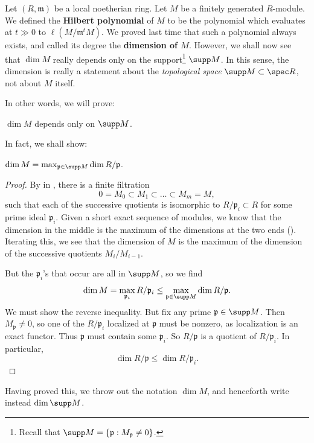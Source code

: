 Let $(R, \mathfrak{m})$ be a local noetherian ring. Let $M$ be a finitely generated
$R$-module. 	We defined the \textbf{Hilbert polynomial} of $M$ to be the
polynomial which evaluates at $t \gg 0$ to $\ell(M/\mathfrak{m}^tM)$. We proved
last time that such a polynomial always exists, and called its degree the
\textbf{dimension of $M$}. However, 
we shall now see that $\dim M$ really depends only on the support\footnote{
Recall that $\supp M = \left\{\mathfrak{p}: M_{\mathfrak{p}}\neq 0\right\}$.} $\supp M$.
In this sense, the dimension is really a statement about the \emph{topological
space} $\supp M \subset \spec R$, not about $M$ itself. 


In other words, we will prove:
\begin{proposition} 
$\dim M$ depends only on $\supp M$.
\end{proposition} 

In fact, we shall show:

\begin{proposition} 
$\dim M = \max_{\mathfrak{p} \in \supp M} \dim R/\mathfrak{p}$.
\end{proposition} 
\begin{proof} 
By  in , there is a finite filtration 
\[ 0 = M_0 \subset M_1 \subset \dots \subset M_m = M,  \]
such that each of the successive quotients is isomorphic to $R/\mathfrak{p}_i
\subset R$
for some prime ideal $\mathfrak{p}_i$. Given a short exact sequence
of modules, we know that the dimension in the middle is the maximum of the dimensions at the
two ends (). Iterating this, we see that the
dimension of $M$ is the maximum of the
dimension of the successive quotients $M_i/M_{i-1}$.

But the $\mathfrak{p}_i$'s that occur
are all in $\supp M$, so we find 
\[ \dim M = \max_{\mathfrak{p}_i} R/\mathfrak{p}_i \leq \max_{\mathfrak{p} \in \supp M} \dim R/\mathfrak{p}.  \]
We must show the reverse inequality. But fix any prime $\mathfrak{p} \in \supp
M$. Then $M_{\mathfrak{p}} \neq 0$, so one of the $R/\mathfrak{p}_i$ localized
at  $\mathfrak{p}$ must be nonzero, as localization is an exact functor. Thus
$\mathfrak{p}$ must contain some $\mathfrak{p}_i$. So $R/\mathfrak{p}$ is a
quotient of $R/\mathfrak{p}_i$. In particular,
\[ \dim R/\mathfrak{p} \leq \dim R/\mathfrak{p}_i.  \]
\end{proof} 

Having proved this, we throw out the notation $\dim M$, and henceforth write
instead $\dim \supp M$.



